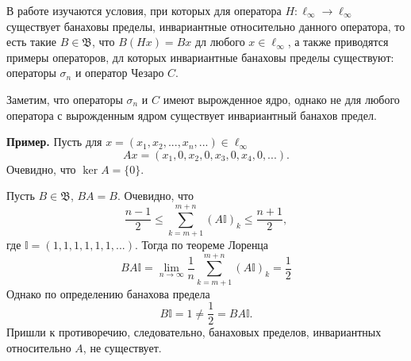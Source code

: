 В работе \cite{Semenov2010invariant} изучаются условия,
при которых для оператора $H:\ell_\infty\to \ell_\infty$ существует банаховы пределы,
инвариантные относительно данного оператора, то есть такие $B\in\mathfrak{B}$,
что $B(Hx) = Bx$ дл любого $x\in\ell_\infty$,
а также приводятся примеры операторов, дл которых инвариантные банаховы пределы существуют: операторы $\sigma_n$ и оператор Чезаро $C$.

Заметим, что операторы $\sigma_n$ и $C$ имеют вырожденное ядро,
однако не для любого оператора с вырожденным ядром существует инвариантный банахов предел.

\textbf{Пример.}
Пусть для $x = (x_1, x_2, ..., x_n, ...)\in \ell_\infty$
\begin{equation*}
	Ax = (x_1, 0, x_2, 0, x_3, 0, x_4, 0, ...).
\end{equation*}
Очевидно, что $\ker A = \{0\}$.

Пусть $B\in\mathfrak{B}$, $BA = B$.
Очевидно, что
\begin{equation*}
	\frac{n-1}{2}\leqslant \sum_{k=m+1}^{m+n} (A\mathbb{I})_k \leqslant \frac{n+1}{2},
\end{equation*}
где $\mathbb{I} = (1, 1, 1, 1, 1, 1, ...)$.
Тогда по теореме Лоренца
\begin{equation*}
	BA\mathbb{I} =
	\lim_{n\to\infty} \frac{1}{n}\sum_{k=m+1}^{m+n} (A\mathbb{I})_k = \frac{1}{2}
\end{equation*}
Однако по определению банахова предела
\begin{equation*}
	B\mathbb{I} = 1 \neq \frac{1}{2} = BA\mathbb{I}.
\end{equation*}
Пришли к противоречию, следовательно, банаховых пределов, инвариантных относительно $A$, не существует.
